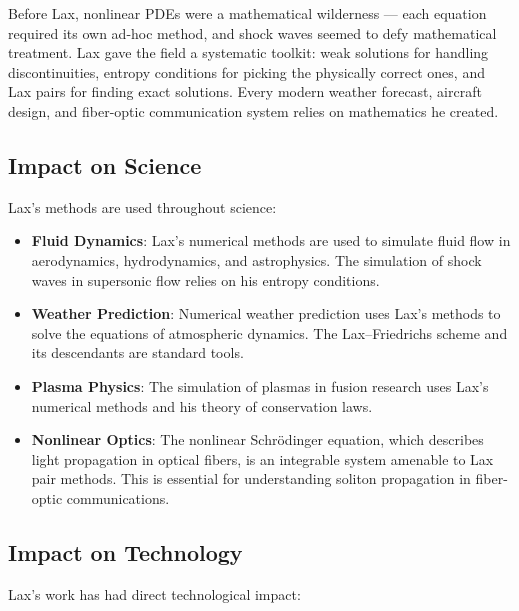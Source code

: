 \begin{whyitmatters}
Before Lax, nonlinear PDEs were a mathematical wilderness --- each equation required its own ad-hoc method, and shock waves seemed to defy mathematical treatment. Lax gave the field a systematic toolkit: weak solutions for handling discontinuities, entropy conditions for picking the physically correct ones, and Lax pairs for finding exact solutions. Every modern weather forecast, aircraft design, and fiber-optic communication system relies on mathematics he created.
\end{whyitmatters}

\subsection{Impact on Science}

Lax's methods are used throughout science:

\begin{itemize}
\item \textbf{Fluid Dynamics}: Lax's numerical methods are used to simulate fluid flow in aerodynamics, hydrodynamics, and astrophysics. The simulation of shock waves in supersonic flow relies on his entropy conditions.

\item \textbf{Weather Prediction}: Numerical weather prediction uses Lax's methods to solve the equations of atmospheric dynamics. The Lax--Friedrichs scheme and its descendants are standard tools.

\item \textbf{Plasma Physics}: The simulation of plasmas in fusion research uses Lax's numerical methods and his theory of conservation laws.

\item \textbf{Nonlinear Optics}: The nonlinear Schr\"odinger equation, which describes light propagation in optical fibers, is an integrable system amenable to Lax pair methods. This is essential for understanding soliton propagation in fiber-optic communications.
\end{itemize}

\subsection{Impact on Technology}

Lax's work has had direct technological impact:

